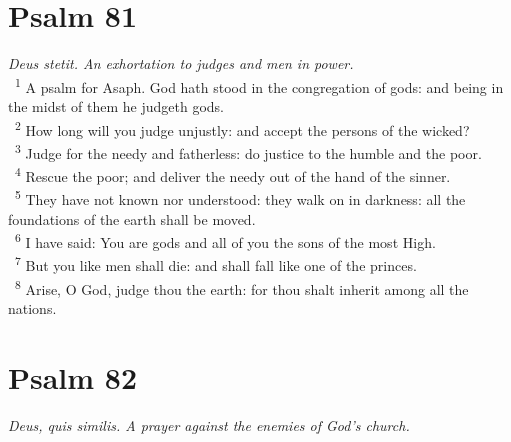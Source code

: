 \documentclass[a5paper,12pt]{article}
\begin{document}
\begin{multicols*}{2}
\section{Psalm 81}
\label{sec:orge831fb9}
\emph{Deus stetit. An exhortation to judges and men in power.}\\

~\textsuperscript{1} A psalm for Asaph. God hath stood in the congregation of gods: and being in the midst of them he judgeth gods.\\
~\textsuperscript{2} How long will you judge unjustly: and accept the persons of the wicked?\\
~\textsuperscript{3} Judge for the needy and fatherless: do justice to the humble and the poor.\\
~\textsuperscript{4} Rescue the poor; and deliver the needy out of the hand of the sinner.\\
~\textsuperscript{5} They have not known nor understood: they walk on in darkness: all the foundations of the earth shall be moved.\\
~\textsuperscript{6} I have said: You are gods and all of you the sons of the most High.\\
~\textsuperscript{7} But you like men shall die: and shall fall like one of the princes.\\
~\textsuperscript{8} Arise, O God, judge thou the earth: for thou shalt inherit among all the nations.\\

\section{Psalm 82}
\label{sec:org3e9531f}
\emph{Deus, quis similis. A prayer against the enemies of God's church.}\\


\end{multicols*}
\end{document}
